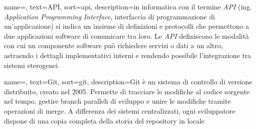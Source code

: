 


    








 {
    name=,
    text=API,
    sort=api,
    description={in informatica con il termine \emph{API} (ing. \emph{Application Programming Interface}, interfaccia di programmazione di un'applicazione) si indica un insieme di definizioni e protocolli che permettono a due applicazioni software di comunicare tra loro. Le \emph{API} definiscono le modalità con cui un componente software può richiedere servizi o dati a un altro, astraendo i dettagli implementativi interni e rendendo possibile l'integrazione tra sistemi eterogenei}
}

 {
    name=,
    text=Git,
    sort=git,
    description={Git è un sistema di controllo di versione distribuito, creato nel 2005. Permette di tracciare le modifiche al codice sorgente nel tempo, gestire branch paralleli di sviluppo e unire le modifiche tramite operazioni di merge. A differenza dei sistemi centralizzati, ogni sviluppatore dispone di una copia completa della storia del repository in locale}
}

